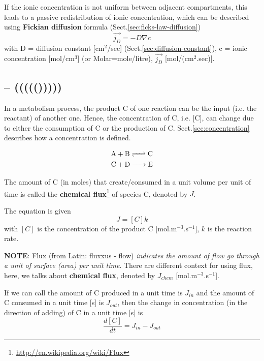 If the ionic concentration is not uniform between adjacent compartments, this
leads to a passive redistribution of ionic concentration, which can be described
using {\bf Fickian diffusion} formula (Sect.\ref{sec:ficks-law-diffusion})
\begin{equation}
  \label{eq:1226}
  \overrightarrow{j_D} = -D\nabla c
\end{equation}
with D = diffusion constant [cm$^2$/sec] (Sect.\ref{sec:diffusion-constant}), c
= ionic concentration [mol/cm$^3$] (or Molar=mole/litre), $\overrightarrow{j_D}$
[mol/(cm$^2$.sec)].


\subsection{-- ((((()))))}
In a metabolism process, the product C of one reaction can be the input (i.e.
the reactant) of another one. Hence, the concentration of C, i.e. [C], can
change due to either the consumption of C or the production of C.
Sect.\ref{sec:concentration} describes how a concentration is defined.

\begin{equation}
  \label{eq:135}
  \begin{split}
    \ce{A + B <=> C} \\
    \ce{C + D -> E}
  \end{split}
\end{equation}

The amount of C (in moles) that create/consumed in a unit volume per
unit of time is called the
{\bf chemical flux}\footnote{\url{http://en.wikipedia.org/wiki/Flux}}
of species C, denoted by $J$. 

The equation is given
\begin{equation}
  \label{eq:85}
  J = [C]k
\end{equation}
with $[C]$ is the concentration of the product C
[mol.m$^{-3}$.s$^{-1}$], $k$ is the reaction rate.

{\bf NOTE}: Flux (from Latin: fluxxus - flow)
{\it indicates the amount of flow go through a unit of surface (area)
  per unit time}.
There are different context for using flux, here, we talks about
{\bf chemical flux}, denoted by $J_{chem}$ [mol.m$^{-3}$.s$^{-1}$].

If we can call the amount of C produced in a unit time is $J_{in}$ and
the amount of C consumed in a unit time [s] is $J_{out}$, then the
change in concentration (in the direction of adding) of C in a unit
time [s] is
\begin{equation}
  \frac{d[C]}{dt}=J_{in} - J_{out}
\end{equation}

